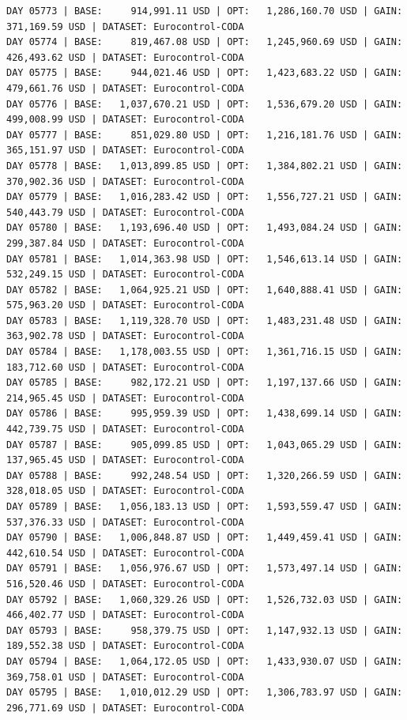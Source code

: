 \documentclass[11pt,a4paper]{article}
\begin{document}
\begin{verbatim}
DAY 05773 | BASE:     914,991.11 USD | OPT:   1,286,160.70 USD | GAIN: 371,169.59 USD | DATASET: Eurocontrol-CODA
DAY 05774 | BASE:     819,467.08 USD | OPT:   1,245,960.69 USD | GAIN: 426,493.62 USD | DATASET: Eurocontrol-CODA
DAY 05775 | BASE:     944,021.46 USD | OPT:   1,423,683.22 USD | GAIN: 479,661.76 USD | DATASET: Eurocontrol-CODA
DAY 05776 | BASE:   1,037,670.21 USD | OPT:   1,536,679.20 USD | GAIN: 499,008.99 USD | DATASET: Eurocontrol-CODA
DAY 05777 | BASE:     851,029.80 USD | OPT:   1,216,181.76 USD | GAIN: 365,151.97 USD | DATASET: Eurocontrol-CODA
DAY 05778 | BASE:   1,013,899.85 USD | OPT:   1,384,802.21 USD | GAIN: 370,902.36 USD | DATASET: Eurocontrol-CODA
DAY 05779 | BASE:   1,016,283.42 USD | OPT:   1,556,727.21 USD | GAIN: 540,443.79 USD | DATASET: Eurocontrol-CODA
DAY 05780 | BASE:   1,193,696.40 USD | OPT:   1,493,084.24 USD | GAIN: 299,387.84 USD | DATASET: Eurocontrol-CODA
DAY 05781 | BASE:   1,014,363.98 USD | OPT:   1,546,613.14 USD | GAIN: 532,249.15 USD | DATASET: Eurocontrol-CODA
DAY 05782 | BASE:   1,064,925.21 USD | OPT:   1,640,888.41 USD | GAIN: 575,963.20 USD | DATASET: Eurocontrol-CODA
DAY 05783 | BASE:   1,119,328.70 USD | OPT:   1,483,231.48 USD | GAIN: 363,902.78 USD | DATASET: Eurocontrol-CODA
DAY 05784 | BASE:   1,178,003.55 USD | OPT:   1,361,716.15 USD | GAIN: 183,712.60 USD | DATASET: Eurocontrol-CODA
DAY 05785 | BASE:     982,172.21 USD | OPT:   1,197,137.66 USD | GAIN: 214,965.45 USD | DATASET: Eurocontrol-CODA
DAY 05786 | BASE:     995,959.39 USD | OPT:   1,438,699.14 USD | GAIN: 442,739.75 USD | DATASET: Eurocontrol-CODA
DAY 05787 | BASE:     905,099.85 USD | OPT:   1,043,065.29 USD | GAIN: 137,965.45 USD | DATASET: Eurocontrol-CODA
DAY 05788 | BASE:     992,248.54 USD | OPT:   1,320,266.59 USD | GAIN: 328,018.05 USD | DATASET: Eurocontrol-CODA
DAY 05789 | BASE:   1,056,183.13 USD | OPT:   1,593,559.47 USD | GAIN: 537,376.33 USD | DATASET: Eurocontrol-CODA
DAY 05790 | BASE:   1,006,848.87 USD | OPT:   1,449,459.41 USD | GAIN: 442,610.54 USD | DATASET: Eurocontrol-CODA
DAY 05791 | BASE:   1,056,976.67 USD | OPT:   1,573,497.14 USD | GAIN: 516,520.46 USD | DATASET: Eurocontrol-CODA
DAY 05792 | BASE:   1,060,329.26 USD | OPT:   1,526,732.03 USD | GAIN: 466,402.77 USD | DATASET: Eurocontrol-CODA
DAY 05793 | BASE:     958,379.75 USD | OPT:   1,147,932.13 USD | GAIN: 189,552.38 USD | DATASET: Eurocontrol-CODA
DAY 05794 | BASE:   1,064,172.05 USD | OPT:   1,433,930.07 USD | GAIN: 369,758.01 USD | DATASET: Eurocontrol-CODA
DAY 05795 | BASE:   1,010,012.29 USD | OPT:   1,306,783.97 USD | GAIN: 296,771.69 USD | DATASET: Eurocontrol-CODA

\end{verbatim}
\end{document}
